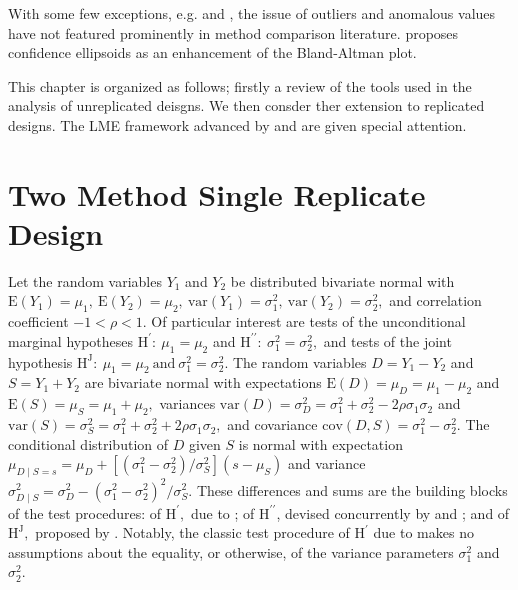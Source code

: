 \documentclass[12pt, a4paper]{report}
\theoremstyle{plain}
\theoremstyle{definition}
\theoremstyle{remark}
\begin{document}
With some few exceptions, e.g. \citet{hawkins1978} and \citet{Bartko}, the issue of outliers and anomalous values have not featured prominently in method comparison literature. \citet{Bartko} proposes confidence ellipsoids as an enhancement of the Bland-Altman plot.


This chapter is organized as follows; firstly a review of the tools used in the analysis of unreplicated deisgns. We then consder ther extension to replicated designs. The LME framework advanced by \citet{BXC2008} and \citet{ARoy2009} are given special attention.





\section{Two Method Single Replicate Design}  
Let the random variables $Y_1$ and $Y_2$ be distributed bivariate normal with $\mathrm{E}(Y_1)=\mu_1,\ \mathrm{E}(Y_2)=\mu_2,\ \mathrm{var}(Y_1)=\sigma^2_1,\ \mathrm{var}(Y_2)=\sigma^2_2,$ and correlation coefficient $-1<\rho<1.$ Of particular interest are tests of the unconditional marginal hypotheses $\textrm{H}^\prime\colon~\mu_1 = \mu_2$ and $\textrm{H}^{\prime\prime}\colon~\sigma^2_1 = \sigma^2_2,$ and tests of the joint hypothesis $\textrm{H}^\mathrm{J}\colon~\mu_1 = \mu_2\ \textrm{and}\ \sigma^2_1 = \sigma^2_2.$ The random variables $D=Y_1-Y_2$ and $S=Y_1+Y_2$ are bivariate normal with expectations $\mathrm{E}(D) = \mu_D = \mu_1- \mu_2$ and $\mathrm{E}(S) = \mu_S = \mu_1+ \mu_2,$ variances $\mathrm{var}(D) = \sigma^2_D = \sigma_1^2 + \sigma_2^2 - 2 \rho \sigma_1 \sigma_2$ and $\mathrm{var}(S) = \sigma^2_S = \sigma_1^2 + \sigma_2^2 + 2 \rho \sigma_1 \sigma_2,$ and covariance $\mathrm{cov}(D,S) = \sigma_1^2 - \sigma_2^2.$ The conditional distribution of $D$ given $S$ is normal with expectation $\mu_{D\mid S=s} = \mu_D + [ ( \sigma^2_1 - \sigma^2_2 ) / \sigma^2_S ] ( s - \mu_S )$ and variance $\sigma^2_{D\mid S} = \sigma^2_D - ( \sigma^2_1 - \sigma^2_2 )^2 / \sigma^2_S.$ These differences and sums are the building blocks of the test procedures: of $\textrm{H}^\prime,$ due to \cite{Student}; of $\textrm{H}^{\prime\prime}$, devised concurrently by \cite{pitman} and \cite{morgan}; and of $\textrm{H}^\mathrm{J},$ proposed by \citet{BB89}. Notably, the classic test procedure of $\textrm{H}^\prime$ due to \cite{Student} makes no assumptions about the equality, or otherwise, of the variance parameters $\sigma^2_1$ and $\sigma^2_2.$
\end{document}
